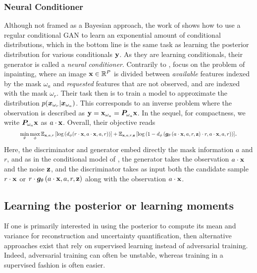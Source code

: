 \subsubsection{Neural Conditioner \citep{belghazi2019learning}}
Although not framed as a Bayesian approach, the work of \citet{belghazi2019learning} shows how to use a regular conditional GAN to learn an exponential amount of conditional distributions, which in the bottom line is the same task as learning the posterior distribution for various conditionals ${\mathbf{y}}$. As they are learning conditionals, their generator is called a \textit{neural conditioner}. Contrarily to \citet{adler2018deep}, \citet{belghazi2019learning} focus on the problem of inpainting, where an image ${\mathbf{x}} \in \mathbb{R}^P$ is divided between \textit{available} features indexed by the mask $\omega_a$ and \textit{requested} features that are not observed, and are indexed with the mask $\omega_r$. Their task then is to train a model to approximate the distribution $p({\bm{x}}_{\omega_r} | {\bm{x}}_{\omega_a})$. This corresponds to an inverse problem where the observation is described as ${\mathbf{y}} = {\mathbf{x}}_{\omega_a} = {\bm{P}}_{\omega_a} {\mathbf{x}}$. In the sequel, for compactness, we write ${\bm{P}}_{\omega_a} {\mathbf{x}}$ as $a \cdot {\mathbf{x}}$. Overall, their objective reads
\begin{equation}
    \resizebox*{.9\linewidth}{!}{$\displaystyle \min_\theta \max_\phi \mathbb{E}_{\rvx, a, r}\left[ \log \left(d_\phi(r \cdot \rvx, a\cdot \rvx, a, r)\right)\right] + \mathbb{E}_{\rvx,a,r,\rvz}\left[\log\left(1 - d_\phi\left(\vg_\theta\left(a\cdot \rvx, a, r, \rvz\right) \cdot r, a\cdot \rvx, a, r\right)\right)\right]$}.\label{eq:nc_objective}
\end{equation}
Here, the discriminator and generator embed directly the mask information $a$ and $r$, and as in the conditional model of , the generator takes the observation $a \cdot {\mathbf{x}}$ and the noise ${\mathbf{z}}$, and the discriminator takes as input both the candidate sample $r \cdot {\mathbf{x}}$ or $r \cdot {\bm{g}}_\theta\left(a\cdot {\mathbf{x}}, a, r, {\mathbf{z}}\right)$ along with the observation $a \cdot {\mathbf{x}}$.

\subsection{Learning the posterior or learning moments}\label{ss:learning_moments}
If one is primarily interested in using the posterior to compute its mean and variance for reconstruction and uncertainty quantification, then alternative approaches exist that rely on supervised learning instead of adversarial training. Indeed, adversarial training can often be unstable, whereas training in a supervised fashion is often easier. 

